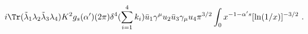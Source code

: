 \begin{equation}
i \Tr (\tilde\lambda_1 \lambda_2 \tilde\lambda_3 \lambda_4)
K^2 g_s (\alpha') (2\pi)
\delta^4 (\sum_{i=1}^4 k_i)
\bar u_1 \gamma^\mu u_2 \bar u_3 \gamma_\mu u_4
\pi^{3/2}
\int_0 x^{-1-\alpha' s} [\ln (1/x)]^{-3/2}\ .
\end{equation}

